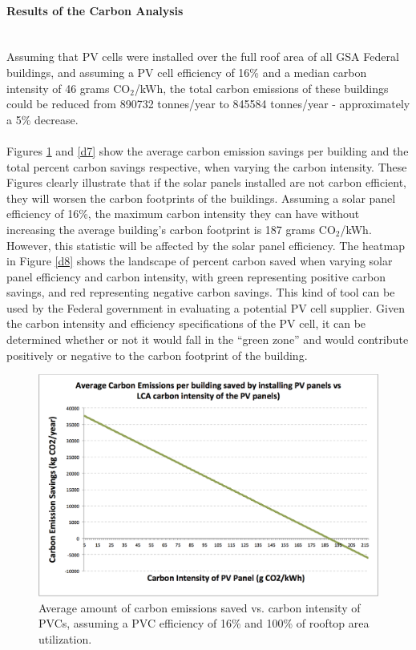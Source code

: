 \paragraph{Results of the Carbon Analysis} \mbox{ }\\
Assuming that PV cells were installed over the full roof area of all GSA Federal buildings, and assuming a PV cell efficiency of 16\% and a median carbon intensity of 46 grams CO$_{2}$/kWh, the total carbon emissions of these buildings could be reduced from 890732 tonnes/year to 845584 tonnes/year - approximately a 5\% decrease.
\\\\
\noindent Figures \ref{d6} and \ref{d7} show the average carbon emission savings per building and the total percent carbon savings respective, when varying the carbon intensity. These Figures clearly illustrate that if the solar panels installed are not carbon efficient, they will worsen the carbon footprints of the buildings. Assuming a solar panel efficiency of 16\%, the maximum carbon intensity they can have without increasing the average building's carbon footprint is 187 grams CO$_{2}$/kWh. However, this statistic will be affected by the solar panel efficiency. The heatmap in Figure \ref{d8} shows the landscape of percent carbon saved when varying solar panel efficiency and carbon intensity, with green representing positive carbon savings, and red representing negative carbon savings. This kind of tool can be used by the Federal government in evaluating a potential PV cell supplier. Given the carbon intensity and efficiency specifications of the PV cell, it can be determined whether or not it would fall in the ``green zone'' and would contribute positively or negative to the carbon footprint of the building.

\begin{figure}
\begin{center}
\includegraphics[scale=0.5]{pics/d6.png}
\caption{Average amount of carbon emissions saved vs. carbon intensity of PVCs, assuming a PVC efficiency of 16\% and 100\% of rooftop area utilization.}
\label{d6}
\end{center}
\end{figure}


